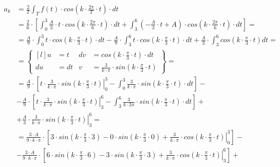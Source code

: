 \begin{task}

\begin{align*}
a_k&=\frac{2}{T}\int_{T}f(t) \cdot cos\left( k \cdot \frac{2\pi}{T} \cdot t\right) \cdot dt\\
&=\frac{2}{6} \cdot \left[\int_{0}^{3}\frac{A}{3}\cdot t \cdot cos\left( k \cdot \frac{2\pi}{6} \cdot t\right) \cdot dt
+\int_{3}^{6}\left(-\frac{A}{3}\cdot t + A\right) \cdot cos\left( k \cdot \frac{2\pi}{6} \cdot t\right) \cdot dt \right]=\\
&=\frac{A}{9} \cdot \int_{0}^{3} t \cdot cos\left( k \cdot \frac{\pi}{3} \cdot t\right) \cdot dt
- \frac{A}{9} \cdot \int_{3}^{6} t \cdot cos\left( k \cdot \frac{\pi}{3} \cdot t\right) \cdot dt + \frac{A}{3} \cdot \int_{3}^{6} cos\left( k \cdot \frac{\pi}{3} \cdot t\right) dt=\\
&=\begin{Bmatrix*}[l]
u&=t & dv&=cos\left( k \cdot \frac{\pi}{3} \cdot t\right) \cdot dt \\
du&=dt & v&=\frac{3}{k\cdot \pi}\cdot sin\left( k \cdot \frac{\pi}{3} \cdot t\right)
\end{Bmatrix*}=\\
&=\frac{A}{9} \cdot \left[ \left. t \cdot \frac{3}{k\cdot \pi}\cdot sin\left( k \cdot \frac{\pi}{3} \cdot t\right) \right|_{0}^{3} - \int_{0}^{3}  \frac{3}{k\cdot \pi}\cdot sin\left( k \cdot \frac{\pi}{3} \cdot t\right) \cdot dt \right]-\\
&-\frac{A}{9} \cdot \left[ \left. t \cdot \frac{3}{k\cdot \pi}\cdot sin\left( k \cdot \frac{\pi}{3} \cdot t\right) \right|_{3}^{6} - \int_{3}^{6}  \frac{3}{k\cdot 3\pi}\cdot sin\left( k \cdot \frac{\pi}{3} \cdot t\right) \cdot dt \right]+\\
&+ \frac{A}{3} \cdot \left. \frac{3}{k\cdot \pi}\cdot sin\left( k \cdot \frac{\pi}{3} \cdot t\right) \right|_{3}^{6}=\\
&=\frac{3 \cdot A}{9 \cdot k \cdot \pi} \cdot \left[ 3 \cdot sin\left( k \cdot \frac{\pi}{3} \cdot 3\right) -  0 \cdot sin\left( k \cdot \frac{\pi}{3} \cdot 0\right)
 + \left. \frac{3}{k\cdot \pi}\cdot cos\left( k \cdot \frac{\pi}{3} \cdot t\right) \right|_{0}^{3}\right]-\\
&-\frac{3 \cdot A}{9 \cdot k \cdot \pi} \cdot \left[ 6 \cdot sin\left( k \cdot \frac{\pi}{3} \cdot 6\right) -  3 \cdot sin\left( k \cdot \frac{\pi}{3} \cdot 3\right)
+ \left. \frac{3}{k\cdot \pi}\cdot cos\left( k \cdot \frac{\pi}{3} \cdot t\right) \right|_{3}^{6}\right]+\\

\end{align*}
\end{task}
